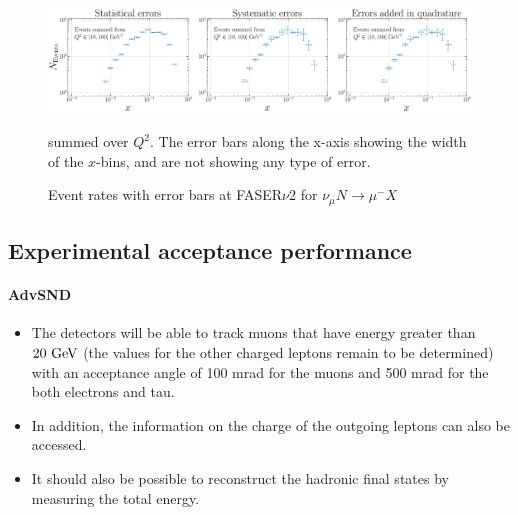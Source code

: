 \begin{figure}[h]
    \centering
    \includegraphics[width = 1\textwidth]{plots/error_plot_FASERv2_14.pdf}
    \caption{Event rates with error bars at FASER$\nu$2 for $\nu_{\mu} N \rightarrow \mu^- X$} summed over $Q^2$. The error bars along the x-axis showing the width of the $x$-bins, and are not showing any type of error.
    \label{fig:my_label}
\end{figure}

\subsection{Experimental acceptance performance} 

\paragraph{AdvSND} 
\begin{itemize}
    \item The detectors will be able to track muons that have energy greater
    than $20~\rm{GeV}$ (the values for the other charged leptons remain to be
    determined) with an acceptance angle of 100 mrad for the muons and 
    500 mrad for the both electrons and tau.
    \item In addition, the information on the charge of the outgoing leptons
    can also be accessed.
    \item It should also be possible to reconstruct the hadronic final states
    by measuring the total energy.
\end{itemize}

